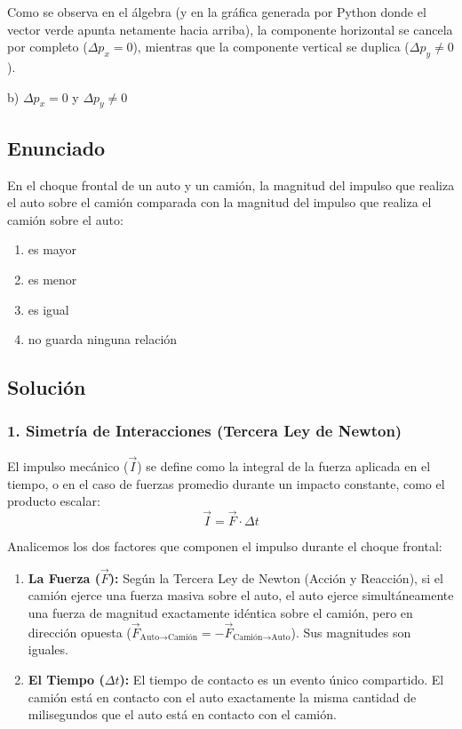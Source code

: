 \documentclass[12pt, a4paper]{article}
\begin{document}
Como se observa en el álgebra (y en la gráfica generada por Python donde el vector verde apunta netamente hacia arriba), la componente horizontal se cancela por completo ($\Delta p_x = 0$), mientras que la componente vertical se duplica ($\Delta p_y \neq 0$). 

\begin{tcolorbox}[colback=green!5!white, colframe=green!50!black, title=Respuesta Final]
\centering \Large b) $\Delta p_x = 0$ y $\Delta p_y \neq 0$
\end{tcolorbox}

\newpage

\subsection*{Enunciado}
En el choque frontal de un auto y un camión, la magnitud del impulso que realiza el auto sobre el camión comparada con la magnitud del impulso que realiza el camión sobre el auto:
\begin{enumerate}[label=\alph*)]
    \item es mayor
    \item es menor
    \item es igual
    \item no guarda ninguna relación
\end{enumerate}

\subsection*{Solución}

\subsubsection*{1. Simetría de Interacciones (Tercera Ley de Newton)}
El impulso mecánico ($\vec{I}$) se define como la integral de la fuerza aplicada en el tiempo, o en el caso de fuerzas promedio durante un impacto constante, como el producto escalar:
$$ \vec{I} = \vec{F} \cdot \Delta t $$

Analicemos los dos factores que componen el impulso durante el choque frontal:
\begin{enumerate}
    \item \textbf{La Fuerza ($\vec{F}$):} Según la Tercera Ley de Newton (Acción y Reacción), si el camión ejerce una fuerza masiva sobre el auto, el auto ejerce simultáneamente una fuerza de magnitud exactamente idéntica sobre el camión, pero en dirección opuesta ($\vec{F}_{\text{Auto} \to \text{Camión}} = -\vec{F}_{\text{Camión} \to \text{Auto}}$). Sus magnitudes son iguales.
    \item \textbf{El Tiempo ($\Delta t$):} El tiempo de contacto es un evento único compartido. El camión está en contacto con el auto exactamente la misma cantidad de milisegundos que el auto está en contacto con el camión.
\end{enumerate}
\end{document}
